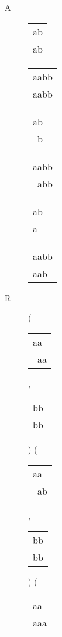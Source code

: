 \begin{description}
\item[A] 
\begin{tabular}{|l|} \hline
ab \\
ab \\
\hline
\end{tabular} 
\begin{tabular}{|l|} \hline
aabb \\
aabb \\
\hline
\end{tabular} 
\begin{tabular}{|l|} \hline
ab \\
\ b \\
\hline
\end{tabular} 
\begin{tabular}{|l|} \hline
aabb \\
\ abb \\
\hline
\end{tabular} 
\begin{tabular}{|l|} \hline
ab \\
a\  \\
\hline
\end{tabular} 
\begin{tabular}{|l|} \hline
aabb \\
aab\  \\
\hline
\end{tabular} 
\item[R] 
 ( 
\begin{tabular}{|l|} \hline
aa\  \\
\ aa \\
\hline
\end{tabular} 
 , 
\begin{tabular}{|l|} \hline
bb \\
bb \\
\hline
\end{tabular} 
) 
 ( 
\begin{tabular}{|l|} \hline
aa\  \\
\ ab \\
\hline
\end{tabular} 
 , 
\begin{tabular}{|l|} \hline
bb \\
bb \\
\hline
\end{tabular} 
) 
 ( 
\begin{tabular}{|l|} \hline
aa\  \\
aaa \\
\hline

\end{tabular}
\end{description}

